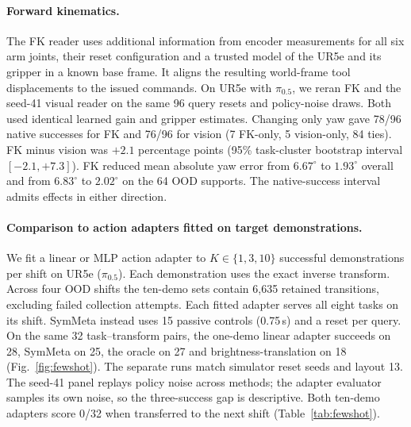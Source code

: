 \documentclass{article}
\theoremstyle{plain}
\theoremstyle{remark}
\begin{document}
\paragraph{Forward kinematics.} The FK reader uses additional information from encoder measurements for all six arm joints, their reset configuration and a trusted model of the UR5e and its gripper in a known base frame. It aligns the resulting world-frame tool displacements to the issued commands. On UR5e with $\pi_{0.5}$, we reran FK and the seed-41 visual reader on the same 96 query resets and policy-noise draws. Both used identical learned gain and gripper estimates. Changing only yaw gave 78/96 native successes for FK and 76/96 for vision (7 FK-only, 5 vision-only, 84 ties). FK minus vision was $+2.1$ percentage points (95\% task-cluster bootstrap interval $[-2.1,+7.3]$). FK reduced mean absolute yaw error from $6.67^\circ$ to $1.93^\circ$ overall and from $6.83^\circ$ to $2.02^\circ$ on the 64 OOD supports. The native-success interval admits effects in either direction.

\paragraph{Comparison to action adapters fitted on target demonstrations.}
We fit a linear or MLP action adapter to $K\in\{1,3,10\}$ successful demonstrations per shift on UR5e ($\pi_{0.5}$). Each demonstration uses the exact inverse transform. Across four OOD shifts the ten-demo sets contain 6,635 retained transitions, excluding failed collection attempts. Each fitted adapter serves all eight tasks on its shift. SymMeta instead uses 15 passive controls (0.75\,s) and a reset per query. On the same 32 task--transform pairs, the one-demo linear adapter succeeds on 28, SymMeta on 25, the oracle on 27 and brightness-translation on 18 (Fig.~\ref{fig:fewshot}). The separate runs match simulator reset seeds and layout 13. The seed-41 panel replays policy noise across methods; the adapter evaluator samples its own noise, so the three-success gap is descriptive. Both ten-demo adapters score 0/32 when transferred to the next shift (Table~\ref{tab:fewshot}).
\end{document}
